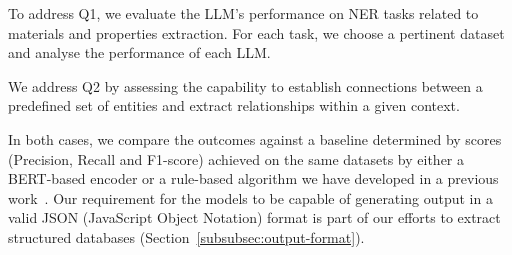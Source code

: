 To address Q1, we evaluate the LLM's performance on NER tasks related to materials and properties extraction. For each task, we choose a pertinent dataset and analyse the performance of each LLM.


We address Q2 by assessing the capability to establish connections between a predefined set of entities and extract relationships within a given context.  

In both cases, we compare the outcomes against a baseline determined by scores (Precision, Recall and F1-score) achieved on the same datasets by either a BERT-based encoder or a rule-based algorithm we have developed in a previous work~\cite{lfoppiano2023automatic, foppiano2019quantities}.
Our requirement for the models to be capable of generating output in a valid JSON (JavaScript Object Notation) format is part of our efforts to extract structured databases (Section~\ref{subsubsec:output-format}).
 

